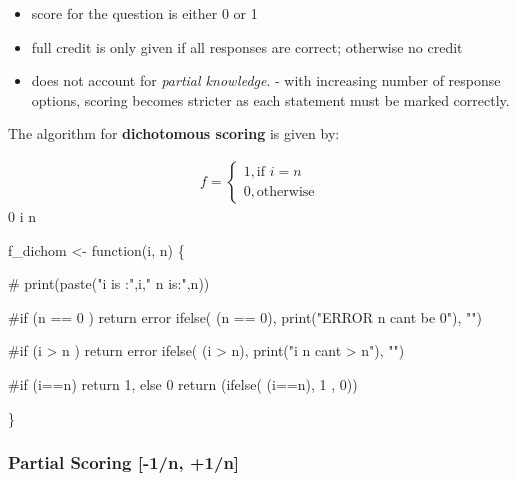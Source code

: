 \documentclass[
  letterpaper,
  DIV=11,
  numbers=noendperiod]{scrreprt}
\newenvironment{Shaded}{\begin{snugshade}}{\end{snugshade}}
\newcommand{\CommentTok}[1]{\textcolor[rgb]{0.37,0.37,0.37}{#1}}
\newcommand{\ControlFlowTok}[1]{\textcolor[rgb]{0.00,0.23,0.31}{#1}}
\newcommand{\DecValTok}[1]{\textcolor[rgb]{0.68,0.00,0.00}{#1}}
\newcommand{\FunctionTok}[1]{\textcolor[rgb]{0.28,0.35,0.67}{#1}}
\newcommand{\NormalTok}[1]{\textcolor[rgb]{0.00,0.23,0.31}{#1}}
\newcommand{\OtherTok}[1]{\textcolor[rgb]{0.00,0.23,0.31}{#1}}
\newcommand{\SpecialCharTok}[1]{\textcolor[rgb]{0.37,0.37,0.37}{#1}}
\newcommand{\StringTok}[1]{\textcolor[rgb]{0.13,0.47,0.30}{#1}}
\providecommand{\tightlist}{%
  \setlength{\itemsep}{0pt}\setlength{\parskip}{0pt}}\usepackage{longtable,booktabs,array}
\begin{document}
\begin{itemize}
\tightlist
\item
  score for the question is either 0 or 1
\item
  full credit is only given if all responses are correct; otherwise no
  credit
\item
  does not account for \emph{partial knowledge}. - with increasing
  number of response options, scoring becomes stricter as each statement
  must be marked correctly.
\end{itemize}

The algorithm for \textbf{dichotomous scoring} is given by:

\begin{gather*}
f = 
\begin{cases}
  1, \text{if } i = n \\    
  0, \text{otherwise}    
\end{cases}
\end{gather*}  0 \le i \le n

\begin{Shaded}
\begin{Highlighting}[]
\NormalTok{f\_dichom }\OtherTok{\textless{}{-}} \ControlFlowTok{function}\NormalTok{(i, n) \{}
 
  \CommentTok{\# print(paste("i is :",i," n is:",n)) }
  
  \CommentTok{\#if (n == 0 ) return error }
  \FunctionTok{ifelse}\NormalTok{( (n }\SpecialCharTok{==} \DecValTok{0}\NormalTok{), }\FunctionTok{print}\NormalTok{(}\StringTok{"ERROR n can\textquotesingle{}t be 0"}\NormalTok{), }\StringTok{""}\NormalTok{)}
  
  \CommentTok{\#if (i \textgreater{} n ) return error }
  \FunctionTok{ifelse}\NormalTok{( (i }\SpecialCharTok{\textgreater{}}\NormalTok{ n), }\FunctionTok{print}\NormalTok{(}\StringTok{"i n can\textquotesingle{}t \textgreater{} n"}\NormalTok{), }\StringTok{""}\NormalTok{)}
  
  \CommentTok{\#if (i==n) return 1, else 0}
  \FunctionTok{return}\NormalTok{ (}\FunctionTok{ifelse}\NormalTok{( (i}\SpecialCharTok{==}\NormalTok{n), }\DecValTok{1}\NormalTok{ , }\DecValTok{0}\NormalTok{))}
 
\NormalTok{\}}
\end{Highlighting}
\end{Shaded}

\hypertarget{partial-scoring--1n-1n}{%
\subsubsection{Partial Scoring {[}-1/n,
+1/n{]}}\label{partial-scoring--1n-1n}}
\end{document}
